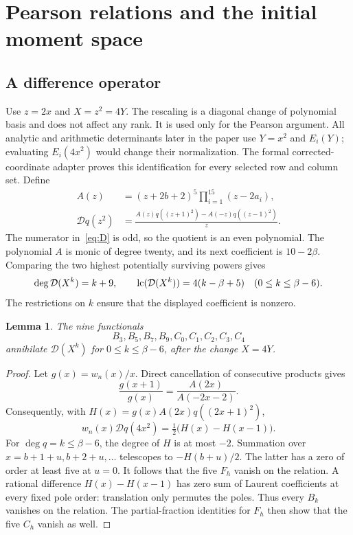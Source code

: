 \documentclass[11pt]{article}
\newtheorem{lemma}[theorem]{Lemma}
\theoremstyle{definition}\newtheorem{definition}[theorem]{Definition}
\theoremstyle{remark}\newtheorem{remark}[theorem]{Remark}
\begin{document}
\section{Pearson relations and the initial moment space}\label{sec:pearson}
\subsection{A difference operator}
Use $z=2x$ and $X=z^2=4Y$.  The rescaling is a diagonal change of polynomial
basis and does not affect any rank. It is used only for the Pearson
argument. All analytic and arithmetic determinants later in the paper use
$Y=x^2$ and $E_i(Y)$; evaluating $E_i(4x^2)$ would change their normalization.
The formal corrected-coordinate adapter proves this identification for
every selected row and column set.  Define
\begin{align}
 A(z)&=(z+2b+2)^5\prod_{i=1}^{15}(z-2a_i),\label{eq:A}\\
 \mathcal Dq(z^2)&=
 \frac{A(z)q((z+1)^2)-A(-z)q((z-1)^2)}{z}.\label{eq:D}
\end{align}
The numerator in~\eqref{eq:D} is odd, so the quotient is an even polynomial.
The polynomial $A$ is monic of degree twenty, and its next coefficient is
$10-2\beta$.  Comparing the two highest potentially surviving powers gives
\begin{equation}\label{eq:D-leading}
 \deg\mathcal D(X^k)=k+9,\qquad
 \operatorname{lc}(\mathcal D(X^k))=4(k-\beta+5)
 \quad(0\le k\le\beta-6).
\end{equation}
The restrictions on $k$ ensure that the displayed coefficient is nonzero.

\begin{lemma}\label{lem:pearson}
The nine functionals
\begin{equation}\label{eq:nine}
 B_3,B_5,B_7,B_9,C_0,C_1,C_2,C_3,C_4
\end{equation}
annihilate $\mathcal D(X^k)$ for $0\le k\le\beta-6$, after the
change $X=4Y$.
\end{lemma}
\begin{proof}
Let $g(x)=w_n(x)/x$.  Direct cancellation of consecutive products gives
\[
 \frac{g(x+1)}{g(x)}=\frac{A(2x)}{A(-2x-2)}.
\]
Consequently, with $H(x)=g(x)A(2x)q((2x+1)^2)$,
\[
 w_n(x)\mathcal Dq(4x^2)=\tfrac12\bigl(H(x)-H(x-1)\bigr).
\]
For $\deg q=k\le\beta-6$, the degree of $H$ is at most $-2$.
Summation over $x=b+1+u,b+2+u,\ldots$ telescopes to $-H(b+u)/2$.
The latter has a zero of order at least five at $u=0$.  It follows that
the five $F_h$ vanish on the relation.  A rational difference
$H(x)-H(x-1)$ has zero sum of Laurent coefficients at every fixed pole
order: translation only permutes the poles.  Thus every $B_k$ vanishes
on the relation.  The partial-fraction identities for $F_h$ then show
that the five $C_h$ vanish as well.
\end{proof}
\end{document}
